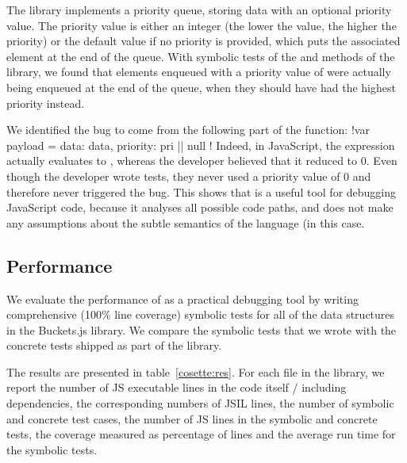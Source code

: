  The  library implements a priority queue, storing data with an optional priority value.
The priority value is either an integer (the lower the value, the higher the priority) or the default  value if no priority is provided, which puts the associated element at the end of the queue.
With symbolic tests of the  and  methods of the library, we found that elements enqueued with a priority value of  were actually being enqueued at the end of the queue, when they should have had the highest priority instead.

We identified the bug to come from the following part of the  function: \jsinline!var payload = { data: data, priority: pri || null }!
Indeed, in JavaScript, the expression  actually evaluates to , whereas the developer believed that it reduced to 0.
Even though the developer wrote tests, they never used a priority value of 0 and therefore never triggered the bug.
This shows that \cosette is a useful tool for debugging JavaScript code, because it analyses all possible code paths, and does not make any assumptions about the subtle semantics of the language (in this case.

\subsection{Performance}

We evaluate the performance of \cosette as a practical debugging tool by writing comprehensive (100\% line coverage) symbolic tests for all of the data structures in the Buckets.js library.
We compare the symbolic tests that we wrote with the concrete tests shipped as part of the library.

The results are presented in table~\ref{cosette:res}.
For each file in the library, we report the number of JS executable lines in the code itself / including dependencies, the corresponding numbers of JSIL lines, the number of symbolic and concrete test cases, the number of JS lines in the symbolic and concrete tests, the coverage measured as percentage of lines and the average \cosette run time for the symbolic tests.

